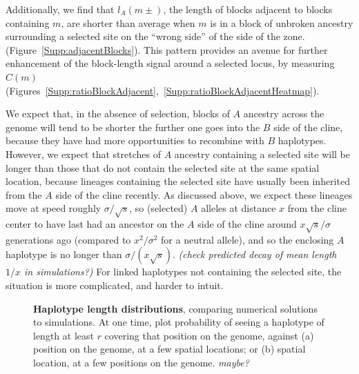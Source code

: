 \documentclass[11pt,letterpaper]{article}
\newcommand{\plr}[1]{{\em \color{blue} #1}}
\begin{document}
Additionally, we find that $l_A(m\pm)$, the length of blocks adjacent to blocks containing $m$, are shorter than average when $m$ is in a block of unbroken ancestry surrounding a selected site on the ``wrong side'' of the side of the zone.  (Figure~\ref{Supp:adjacentBlocks}). This pattern provides an avenue for further enhancement of the block-length signal around a selected locus, by measuring $C(m)$  (Figures~\ref{Supp:ratioBlockAdjacent},~\ref{Supp:ratioBlockAdjacentHeatmap}).


We expect that, in the absence of selection, blocks of $A$ ancestry across the genome 
will tend to be shorter the further one goes into the $B$ side of the cline,
because they have had more opportunities to recombine with $B$ haplotypes. 
However, we expect that stretches of $A$ ancestry containing a selected site will be longer
than those that do not contain the selected site at the same spatial location,
because lineages containing the selected site have usually been inherited from the $A$ side of the cline recently. 
As discussed above, we expect these lineages move at speed roughly $\sigma/\sqrt{s}$,
so (selected) $A$ alleles at distance $x$ from the cline center
to have last had an ancestor on the $A$ side of the cline around $x \sqrt{s}/\sigma$ generations ago 
(compared to $x^2/\sigma^2$ for a neutral allele),
and so the enclosing $A$ haplotype is no longer than $\sigma/(x \sqrt{s})$.
\plr{(check predicted decay of mean length $1/x$ in simulations?)}
For linked haplotypes not containing the selected site, the situation is more complicated, and harder to intuit.


\begin{figure}
    \begin{center}
    \end{center}
    \caption{
        \textbf{Haplotype length distributions},
        comparing numerical solutions to simulations.
        At one time, plot 
        probability of seeing a haplotype of length at least $r$ covering that position on the genome,
        against (a) position on the genome, at a few spatial locations;
        or (b) spatial location, at a few positions on the genome.
        \plr{maybe?}
        \label{fig:haplotype_lengths}
    }
\end{figure}





\end{document}
